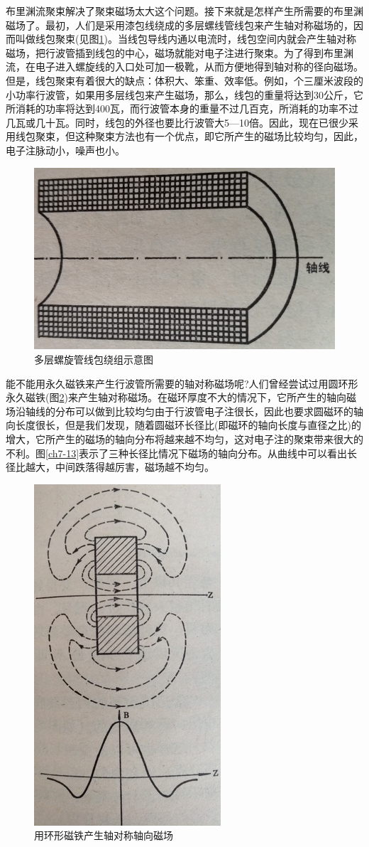 布里渊流聚束解决了聚束磁场太大这个问题。接下来就是怎样产生所需要的布里渊磁场了。最初，人们是采用漆包线绕成的多层螺线管线包来产生轴对称磁场的，因而叫做线包聚束(见图\ref{ch7-11})。当线包导线内通以电流时，线包空间内就会产生轴对称磁场，把行波管插到线包的中心，磁场就能对电子注进行聚束。为了得到布里渊流，在电子进入螺旋线的入口处可加一极靴，从而方便地得到轴对称的径向磁场。但是，线包聚束有着很大的缺点：体积大、笨重、效率低。例如，个三厘米波段的小功率行波管，如果用多层线包来产生磁场，那么，线包的重量将达到30公斤，它所消耗的功率将达到400瓦，而行波管本身的重量不过几百克，所消耗的功率不过几瓦或几十瓦。同时，线包的外径也要比行波管大5—10倍。因此，现在已很少采用线包聚束，但这种聚束方法也有一个优点，即它所产生的磁场比较均匀，因此，电子注脉动小，噪声也小。
\begin{figure}[phtb]
	\centering
	\includegraphics[width=0.47\linewidth]{figure/ch7-11}
	\caption{多层螺旋管线包绕组示意图}
	\label{ch7-11}
\end{figure}

能不能用永久磁铁来产生行波管所需要的轴对称磁场呢?人们曾经尝试过用圆环形永久磁铁(图\ref{ch7-12})来产生轴对称磁场。在磁环厚度不大的情况下，它所产生的轴向磁场沿轴线的分布可以做到比较均匀由于行波管电子注很长，因此也要求圆磁环的轴向长度很长，但是我们发现，随着圆磁环长径比(即磁环的轴向长度与直径之比)的增大，它所产生的磁场的轴向分布将越来越不均匀，这对电子注的聚束带来很大的不利。图\ref{ch7-13}表示了三种长径比情况下磁场的轴向分布。从曲线中可以看出长径比越大，中间跌落得越厉害，磁场越不均匀。
\begin{figure}[phtb]
	\centering
	\includegraphics[width=0.35\linewidth]{figure/ch7-12}
	\caption{用环形磁铁产生轴对称轴向磁场}
	\label{ch7-12}
\end{figure}

